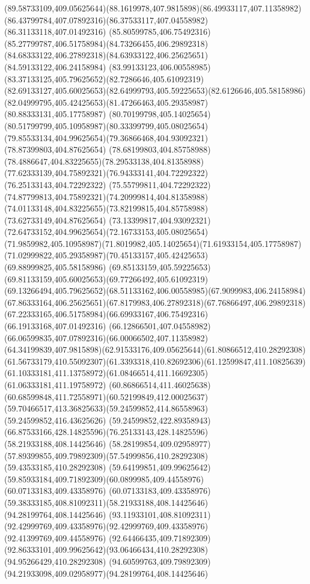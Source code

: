 {{	\curveto(89.58733109,409.05625644)(88.1619978,407.9815898)(86.49933117,407.11358982)
	\curveto(86.43799784,407.07892316)(86.37533117,407.04558982)(86.31133118,407.01492316)
	\curveto(85.80599785,406.75492316)(85.27799787,406.51758984)(84.73266455,406.29892318)
	\curveto(84.68333122,406.27892318)(84.63933122,406.25625651)(84.59133122,406.24158984)
	\curveto(83.99133123,406.00558985)(83.37133125,405.79625652)(82.7286646,405.61092319)
	\curveto(82.69133127,405.60025653)(82.64999793,405.59225653)(82.6126646,405.58158986)
	\curveto(82.04999795,405.42425653)(81.47266463,405.29358987)(80.88333131,405.17758987)
	\curveto(80.70199798,405.14025654)(80.51799799,405.10958987)(80.33399799,405.08025654)
	\curveto(79.85533134,404.99625654)(79.36866468,404.93092321)(78.87399803,404.87625654)
	\curveto(78.68199803,404.85758988)(78.4886647,404.83225655)(78.29533138,404.81358988)
	\curveto(77.62333139,404.75892321)(76.94333141,404.72292322)(76.25133143,404.72292322)
	\curveto(75.55799811,404.72292322)(74.87799813,404.75892321)(74.20999814,404.81358988)
	\curveto(74.01133148,404.83225655)(73.82199815,404.85758988)(73.62733149,404.87625654)
	\curveto(73.13399817,404.93092321)(72.64733152,404.99625654)(72.16733153,405.08025654)
	\curveto(71.9859982,405.10958987)(71.8019982,405.14025654)(71.61933154,405.17758987)
	\curveto(71.02999822,405.29358987)(70.45133157,405.42425653)(69.88999825,405.58158986)
	\curveto(69.85133159,405.59225653)(69.81133159,405.60025653)(69.77266492,405.61092319)
	\curveto(69.13266494,405.79625652)(68.51133162,406.00558985)(67.9099983,406.24158984)
	\curveto(67.86333164,406.25625651)(67.8179983,406.27892318)(67.76866497,406.29892318)
	\curveto(67.22333165,406.51758984)(66.69933167,406.75492316)(66.19133168,407.01492316)
	\curveto(66.12866501,407.04558982)(66.06599835,407.07892316)(66.00066502,407.11358982)
	\curveto(64.34199839,407.9815898)(62.91533176,409.05625644)(61.80866512,410.28292308)
	\curveto(61.56733179,410.55092307)(61.3393318,410.82692306)(61.12599847,411.10825639)
	\curveto(61.10333181,411.13758972)(61.08466514,411.16692305)(61.06333181,411.19758972)
	\curveto(60.86866514,411.46025638)(60.68599848,411.72558971)(60.52199849,412.00025637)
	\curveto(59.70466517,413.36825633)(59.24599852,414.86558963)(59.24599852,416.43625626)
	\curveto(59.24599852,422.89358943)(66.87533166,428.14825596)(76.25133143,428.14825596)
	\moveto(58.21933188,408.14425646)
	\curveto(58.28199854,409.02958977)(57.89399855,409.79892309)(57.54999856,410.28292308)
	\lineto(59.43533185,410.28292308)
	\curveto(59.64199851,409.99625642)(59.85933184,409.71892309)(60.0899985,409.44558976)
	\lineto(60.07133183,409.43358976)
	\curveto(60.07133183,409.43358976)(59.38333185,408.81092311)(58.21933188,408.14425646)
	\moveto(94.28199764,408.14425646)
	\curveto(93.11933101,408.81092311)(92.42999769,409.43358976)(92.42999769,409.43358976)
	\lineto(92.41399769,409.44558976)
	\curveto(92.64466435,409.71892309)(92.86333101,409.99625642)(93.06466434,410.28292308)
	\lineto(94.95266429,410.28292308)
	\curveto(94.60599763,409.79892309)(94.21933098,409.02958977)(94.28199764,408.14425646)
}
}
